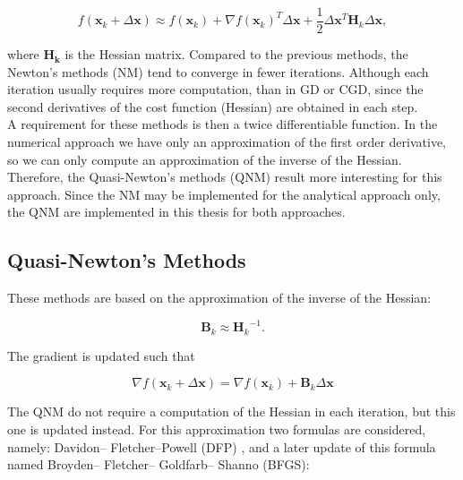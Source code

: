 \begin{equation}
{f(\mathbf{x}_k + \Delta \mathbf{x}) }\approx {f(\mathbf{x}_k) } + {\nabla f(\mathbf{x}_k)^{T} }{\Delta \mathbf{x}} + \frac{1}{2} {\Delta \mathbf{x}^{T} }\mathbf{H}_k {\Delta \mathbf{x}},
\end{equation}

where $\mathbf{H_k}$ is the Hessian matrix.  Compared to the previous methods, the Newton's methods (NM) tend to converge in fewer iterations. Although each iteration usually requires more computation, than in GD or CGD, since the second derivatives of the cost function (Hessian) are obtained in each step. \\
A requirement for these methods is then a twice differentiable function.  
In the numerical approach we have only  an approximation of the first order derivative, so  we can only compute an approximation of the inverse of the Hessian. Therefore, the Quasi-Newton's methods (QNM) result more interesting for this approach. Since the NM may be implemented for the analytical approach only, the QNM are implemented in this thesis for both approaches.


\subsection{Quasi-Newton's Methods}
\label{subsec:quasinewton}


 
These methods are based on the approximation of the inverse of the Hessian:

\begin{equation}
\mathbf{B}_k \approx {\mathbf{H}_k}^{-1}. 
\end{equation}

The gradient is updated such that

\begin{equation}
\nabla f(\mathbf{x}_k + \Delta \mathbf{x})= \nabla f(\mathbf{x}_k) + \mathbf{B}_k {\Delta \mathbf{x} }
\end{equation}



The QNM do not require a computation of the Hessian in each iteration, but this one is updated instead.
For this approximation two formulas are considered, namely: Davidon–
Fletcher–Powell (DFP) \cite{DFP}, and a later update of this formula named Broyden– Fletcher– Goldfarb– Shanno (BFGS)\cite{BFGS}:


